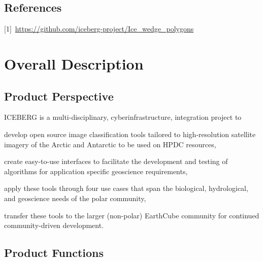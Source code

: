 \documentclass{scrreprt}
\begin{document}
\section{References}
[1]~\url{https://github.com/iceberg-project/Ice_wedge_polygons}

\chapter{Overall Description}

\section{Product Perspective}
\iffalse
$<$Describe the context and origin of the product being specified in this SRS.  
For example, state whether this product is a follow-on member of a product 
family, a replacement for certain existing systems, or a new, self-contained 
product. If the SRS defines a component of a larger system, relate the 
requirements of the larger system to the functionality of this software and 
identify interfaces between the two. A simple diagram that shows the major 
components of the overall system, subsystem interconnections, and external 
interfaces can be helpful.$>$
\fi
ICEBERG is a multi-disciplinary, cyberinfrastructure, integration project to 
\begin{inparaenum}[(1)]
    \item develop open source image classification tools tailored to high-resolution 
	satellite imagery of the Arctic and Antarctic to be used on HPDC resources,
	\item create easy-to-use interfaces to facilitate the development and testing 
	of algorithms for application specific geoscience requirements,
	\item apply these tools through four use cases that span the biological, 
	hydrological, and geoscience needs of the polar community,
	\item transfer these tools to the larger (non-polar) EarthCube community for 
	continued community-driven development.
\end{inparaenum}

\section{Product Functions}
\iffalse
$<$Summarize the major functions the product must perform or must let the user 
perform. Details will be provided in Section 3, so only a high level summary 
(such as a bullet list) is needed here. Organize the functions to make them 
understandable to any reader of the SRS. A picture of the major groups of 
related requirements and how they relate, such as a top level data flow diagram 
or object class diagram, is often effective.$>$
\fi
\begin{figure}[H]
 \centering
\end{figure}
\end{document}
